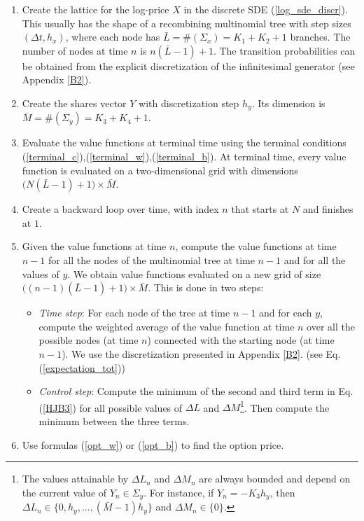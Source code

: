 \begin{enumerate}
 \item Create the lattice for the log-price $X$ in the discrete SDE (\ref{log_sde_discr}). 
 This usually has the shape of a recombining multinomial tree with step sizes $(\Delta t,h_x)$, where each node has $\bar L = \#(\Sigma_x) = K_1 + K_2 +1$ branches.  
 The number of nodes at time $n$ is $n(\bar L-1)+1$.
 The transition probabilities
 can be obtained from the explicit discretization of the infinitesimal generator (see Appendix \ref{B2}).
 \item Create the shares vector $Y$ with discretization step $h_y$. Its dimension is $\bar M = \#(\Sigma_y) = K_3+K_4+1$.
 \item Evaluate the value functions at terminal time using the terminal conditions 
 (\ref{terminal_c}),(\ref{terminal_w}),(\ref{terminal_b}).
 At terminal time, every value function is evaluated on a two-dimensional grid with dimensions $\bigl( N(\bar L-1)+1 \bigl) \times \bar M$.
 \item Create a backward loop over time, with index $n$ that starts at $N$ and finishes at $1$.
 \item Given the value functions at time $n$, compute the value functions at time $n-1$ for all the nodes of the multinomial tree at time $n-1$ and for all the values of $y$.
  We obtain value functions evaluated on a new grid of size 
 $\bigl( (n-1)(\bar L-1)+1 \bigl) \times \bar M$. This is done in two steps:
 \begin{itemize}
  \item \emph{Time step}: For each node of the tree at time $n-1$ and for each $y$, 
  compute the weighted average of the value function at time $n$ 
  over all the possible nodes (at time $n$) connected with the starting node (at time $n-1$). We use the discretization presented in
  Appendix \ref{B2}. (see Eq. (\ref{expectation_tot}))
  \item \emph{Control step}: Compute the minimum of the second and third term in Eq. (\ref{HJB3}) 
  for all possible values of $\Delta L$ and $\Delta M$\footnote{The values attainable by $\Delta L_n$ and $\Delta M_n$ are always bounded and depend 
  on the current value of $Y_n \in \Sigma_y$. 
  For instance, if $Y_n = -K_3 h_y$, then $\Delta L_n \in \{0, h_y, ...,(\bar M-1) h_y \}$ and $\Delta M_n \in \{0\}$.}.
  Then compute the minimum between the three terms.
 \end{itemize}
 \item Use formulas (\ref{opt_w}) or (\ref{opt_b}) to find the option price.      
\end{enumerate}

